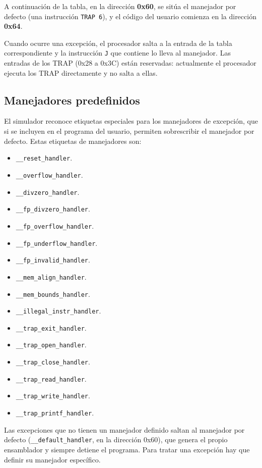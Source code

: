 \documentclass[../main.tex]{subfiles}
\begin{document}
A continuación de la tabla, en la dirección \textbf{0x60}, se sitúa el manejador por defecto (una instrucción \texttt{TRAP 6}), y el código del usuario comienza en la dirección \textbf{0x64}.

Cuando ocurre una excepción, el procesador salta a la entrada de la tabla correspondiente y la instrucción \texttt{J} que contiene lo lleva al manejador. Las entradas de los TRAP (0x28 a 0x3C) están reservadas: actualmente el procesador ejecuta los TRAP directamente y no salta a ellas.

\subsection{Manejadores predefinidos}

El simulador reconoce etiquetas especiales para los manejadores de excepción, que si se incluyen en el programa del usuario, permiten sobrescribir el manejador por defecto. Estas etiquetas de manejadores son:

\begin{itemize}
	\item \texttt{\_\_reset\_handler}.
	\item \texttt{\_\_overflow\_handler}.
	\item \texttt{\_\_divzero\_handler}.
	\item \texttt{\_\_fp\_divzero\_handler}.
	\item \texttt{\_\_fp\_overflow\_handler}.
	\item \texttt{\_\_fp\_underflow\_handler}.
	\item \texttt{\_\_fp\_invalid\_handler}.
	\item \texttt{\_\_mem\_align\_handler}.
	\item \texttt{\_\_mem\_bounds\_handler}.
	\item \texttt{\_\_illegal\_instr\_handler}.
	\item \texttt{\_\_trap\_exit\_handler}.
	\item \texttt{\_\_trap\_open\_handler}.
	\item \texttt{\_\_trap\_close\_handler}.
	\item \texttt{\_\_trap\_read\_handler}.
	\item \texttt{\_\_trap\_write\_handler}.
	\item \texttt{\_\_trap\_printf\_handler}.
\end{itemize}

Las excepciones que no tienen un manejador definido saltan al manejador por defecto (\texttt{\_\_default\_handler}, en la dirección 0x60), que genera el propio ensamblador y siempre detiene el programa. Para tratar una excepción hay que definir su manejador específico.
\end{document}
